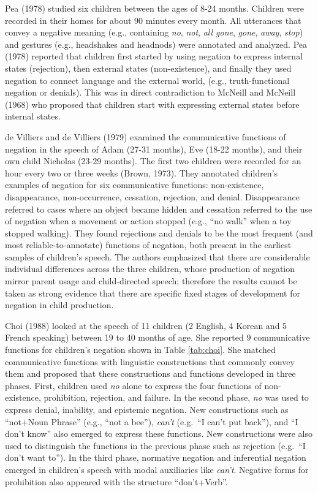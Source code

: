 \documentclass[
  man,floatsintext]{apa6}
\begin{document}
Pea (1978) studied six children between the ages of 8-24 months. Children were recorded in their homes for about 90 minutes every month. All utterances that convey a negative meaning (e.g., containing \emph{no}, \emph{not}, \emph{all gone}, \emph{gone}, \emph{away}, \emph{stop}) and gestures (e.g., headshakes and headnods) were annotated and analyzed. Pea (1978) reported that children first started by using negation to express internal states (rejection), then external states (non-existence), and finally they used negation to connect language and the external world, (e.g., truth-functional negation or denials). This was in direct contradiction to McNeill and McNeill (1968) who proposed that children start with expressing external states before internal states.

de Villiers and de Villiers (1979) examined the communicative functions of negation in the speech of Adam (27-31 months), Eve (18-22 months), and their own child Nicholas (23-29 months). The first two children were recorded for an hour every two or three weeks (Brown, 1973). They annotated children's examples of negation for six communicative functions: non-existence, disappearance, non-occurrence, cessation, rejection, and denial. Disappearance referred to cases where an object became hidden and cessation referred to the use of negation when a movement or action stopped (e.g., ``no walk'' when a toy stopped walking). They found rejections and denials to be the most frequent (and most reliable-to-annotate) functions of negation, both present in the earliest samples of children's speech. The authors emphasized that there are considerable individual differences across the three children, whose production of negation mirror parent usage and child-directed speech; therefore the results cannot be taken as strong evidence that there are specific fixed stages of development for negation in child production.

Choi (1988) looked at the speech of 11 children (2 English, 4 Korean and 5 French speaking) between 19 to 40 months of age. She reported 9 communicative functions for children's negation shown in Table \ref{tab:choi}. She matched communicative functions with linguistic constructions that commonly convey them and proposed that these constructions and functions developed in three phases. First, children used \emph{no} alone to express the four functions of non-existence, prohibition, rejection, and failure. In the second phase, \emph{no} was used to express denial, inability, and epistemic negation. New constructions such as ``not+Noun Phrase'' (e.g., ``not a bee''), \emph{can't} (e.g.~``I can't put back''), and ``I don't know'' also emerged to express these functions. New constructions were also used to distinguish the functions in the previous phase such as rejection (e.g.~``I don't want to''). In the third phase, normative negation and inferential negation emerged in children's speech with modal auxiliaries like \emph{can't}. Negative forms for prohibition also appeared with the structure ``don't+Verb''.
\end{document}
